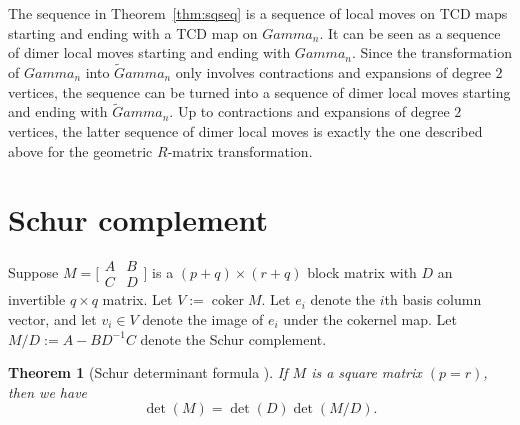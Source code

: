 \documentclass[10pt,a4paper]{amsart}
\numberwithin{equation}{section}
\newtheorem{Theorem}{Theorem}[section]
\newcommand{\C}{{\mathbb C}}
\newcommand{\la}{\label}
\DeclareMathOperator{\coker}{coker}
\def\Gamma{Gamma}
\def\C{C}
\begin{document}
	The sequence in Theorem~\ref{thm:sqseq} is a sequence of local moves on TCD maps starting and ending with a TCD map on $\Gamma_n$. It can be seen as a sequence of dimer local moves starting and ending with $\Gamma_n$. Since the transformation of $\Gamma_n$ into $\widetilde\Gamma_n$ only involves contractions and expansions of degree $2$ vertices, the sequence can be turned into a sequence of dimer local moves starting and ending with $\widetilde\Gamma_n$. Up to contractions and expansions of degree $2$ vertices, the latter sequence of dimer local moves is exactly the one described above for the geometric $R$-matrix transformation.
	
\appendix

		\section{Schur complement}
		\label{sec:schur}
		Suppose $M=\bigl[\begin{smallmatrix}
			A &B\\C&D
		\end{smallmatrix}\bigr]$
		is a $(p+q) \times (r+q)$ block matrix with $D$ an invertible $q \times q$ matrix. Let $V:=\coker M$. Let $e_i$ denote the $i$th basis column vector, and let $v_i \in V$ denote the image of $e_i$ under the cokernel map. Let $M/D:=A-B D^{-1} C$ denote the Schur complement.
		
		\begin{Theorem}[Schur determinant formula \cite{Schur}] \la{thm::schur1}
			If $M$ is a square matrix $(p=r)$, then we have%
			\[
			\det (M) = \det (D) \det (M/D).
			\]
		\end{Theorem}
		
\end{document}
